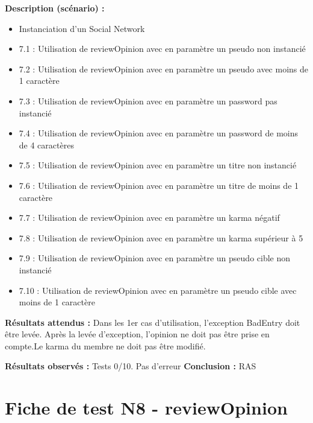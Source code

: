 \documentclass[12pt,a4paper]{report}
\begin{document}
\textbf{Description (scénario) :}
\begin{itemize}
	\item	Instanciation d'un Social Network
	\item	7.1 : Utilisation de reviewOpinion avec en paramètre un pseudo non instancié
	\item	7.2 : Utilisation de reviewOpinion avec en paramètre un pseudo avec moins de 1 caractère
	\item	7.3 : Utilisation de reviewOpinion avec en paramètre un password pas instancié
	\item	7.4 : Utilisation de reviewOpinion avec en paramètre un password de moins de 4 caractères
	\item	7.5 : Utilisation de reviewOpinion avec en paramètre un titre non instancié
	\item	7.6 : Utilisation de reviewOpinion avec en paramètre un titre de moins de 1 caractère
	\item	7.7 : Utilisation de reviewOpinion avec en paramètre un karma négatif
	\item	7.8 : Utilisation de reviewOpinion avec en paramètre un karma supérieur à 5
	\item	7.9 : Utilisation de reviewOpinion avec en paramètre un pseudo cible non instancié
	\item	7.10 : Utilisation de reviewOpinion avec en paramètre un pseudo cible avec moins de 1 caractère
\end{itemize}

\textbf{Résultats attendus :}
Dans les 1er cas d'utilisation, l'exception BadEntry doit être levée.
Après la levée d'exception, l'opinion ne doit pas être prise en compte.Le karma du membre ne doit pas être modifié.

\textbf{Résultats observés :}
Tests 0/10. Pas d'erreur
\textbf{Conclusion : }RAS

\chapter{Fiche de test N8 - reviewOpinion}    
\end{document}
